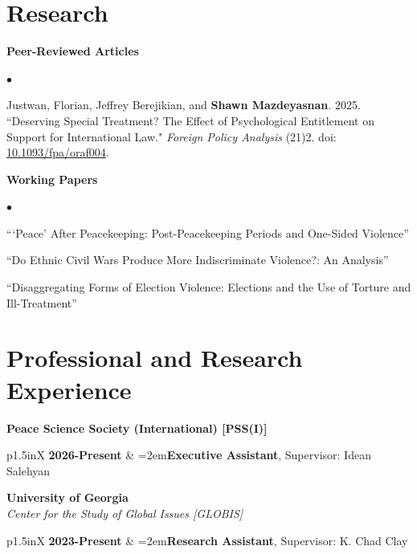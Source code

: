 \documentclass[letterpaper,12pt]{article}
\newenvironment{list2}{
  \begin{list}{$\bullet$}{%
      \setlength{\itemsep}{0in}
      \setlength{\parsep}{0in} 
      \setlength{\parskip}{0in}
      \setlength{\topsep}{0in} 
      \setlength{\partopsep}{0in}
      \setlength{\leftmargin}{1in}
      \setlength{\labelsep}{1em}
      \setlength{\labelwidth}{1em}
      \setlength{\itemindent}{-2em}
      \setlength{\listparindent}{2em}}}{\end{list}}
\begin{document}
\section{Research}
\textbf{Peer-Reviewed Articles}
\par
\begin{list2}
    \item[1.] Justwan, Florian, Jeffrey Berejikian, and \textbf{Shawn Mazdeyasnan}. 2025. ``Deserving Special \mbox{Treatment?} The Effect of Psychological Entitlement on Support for International Law." \textit{\mbox{Foreign} Policy Analysis} (21)2. doi: \href{https://doi.org/10.1093/fpa/oraf004}{10.1093/fpa/oraf004}.
\end{list2}
\par
\textbf{Working Papers}
\par
\begin{list2}
    \item[3.] ```Peace' After Peacekeeping: Post-Peacekeeping Periods and One-Sided Violence”
    \item[2.] ``Do Ethnic Civil Wars Produce More Indiscriminate Violence?: An Analysis”
    \item[1.] ``Disaggregating Forms of Election Violence: Elections and the Use of Torture and Ill-Treatment” 
\end{list2}

\section{Professional and Research Experience}
\textbf{Peace Science Society (International) [PSS(I)]}
\begin{xltabular}{\dimexpr\textwidth-0in}{p{1.5in}X}
\textbf{2026-Present} & \hangindent=2em\textbf{Executive Assistant}, Supervisor: Idean Salehyan
\end{xltabular}

\textbf{University of Georgia}\\
\textit{Center for the Study of Global Issues [GLOBIS]}
\begin{xltabular}{\dimexpr\textwidth-0in}{p{1.5in}X}
\textbf{2023-Present} & \hangindent=2em\textbf{Research Assistant}, Supervisor: K. Chad Clay
\end{xltabular}
\end{document}
